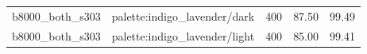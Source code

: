 \begin{longtable}{l>{\raggedright\arraybackslash}p{.42\linewidth}rrr}
b8000\_\allowbreak{}both\_\allowbreak{}s303 & %
palette:indigo\_\allowbreak{}lavender/dark & %
400 & %
87.50 & %
99.49 \\ %

b8000\_\allowbreak{}both\_\allowbreak{}s303 & %
palette:indigo\_\allowbreak{}lavender/light & %
400 & %
85.00 & %
99.41 \\ %


\end{longtable}
